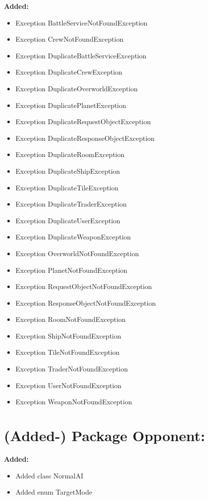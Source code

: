 \documentclass{article}
\begin{document}
\textbf{Added:}
\begin{itemize}
\item Exception BattleServiceNotFoundException
\item Exception CrewNotFoundException
\item Exception DuplicateBattleServiceException
\item Exception DuplicateCrewException
\item Exception DuplicateOverworldException
\item Exception DuplicatePlanetException
\item Exception DuplicateRequestObjectException
\item Exception DuplicateResponseObjectException
\item Exception DuplicateRoomException
\item Exception DuplicateShipException
\item Exception DuplicateTileException
\item Exception DuplicateTraderException
\item Exception DuplicateUserException
\item Exception DuplicateWeaponException
\item Exception OverworldNotFoundException
\item Exception PlanetNotFoundException
\item Exception RequestObjectNotFoundException
\item Exception ResponseObjectNotFoundException
\item Exception RoomNotFoundException
\item Exception ShipNotFoundException
\item Exception TileNotFoundException
\item Exception TraderNotFoundException
\item Exception UserNotFoundException
\item Exception WeaponNotFoundException
\end{itemize}


\section{(Added-) Package Opponent:}

\textbf{Added:}
\begin{itemize}
\item Added class NormalAI
\item Added enum TargetMode
\end{itemize}
\end{document}
